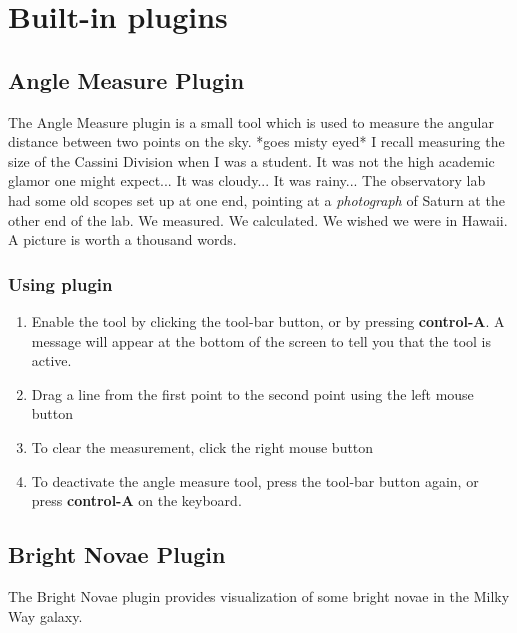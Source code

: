 
\chapter{Built-in plugins}\label{built-in-plugins}

\section{Angle Measure Plugin}\label{angle-measure-plugin}


The Angle Measure plugin is a small tool which is used to measure the
angular distance between two points on the sky. *goes misty eyed* I
recall measuring the size of the Cassini Division when I was a student.
It was not the high academic glamor one might expect... It was cloudy...
It was rainy... The observatory lab had some old scopes set up at one
end, pointing at a \emph{photograph} of Saturn at the other end of the
lab. We measured. We calculated. We wished we were in Hawaii. A picture
is worth a thousand words.

\subsection{Using plugin}\label{using-plugin}

\begin{enumerate}
\item
  Enable the tool by clicking the tool-bar button, or by pressing
  \textbf{control-A}. A message will appear at the bottom of the screen
  to tell you that the tool is active.
\item
  Drag a line from the first point to the second point using the left
  mouse button
\item
  To clear the measurement, click the right mouse button
\item
  To deactivate the angle measure tool, press the tool-bar button again,
  or press \textbf{control-A} on the keyboard.
\end{enumerate}

\section{Bright Novae Plugin}\label{bright-novae-plugin}

The Bright Novae plugin provides visualization of some bright novae in
the Milky Way galaxy.

